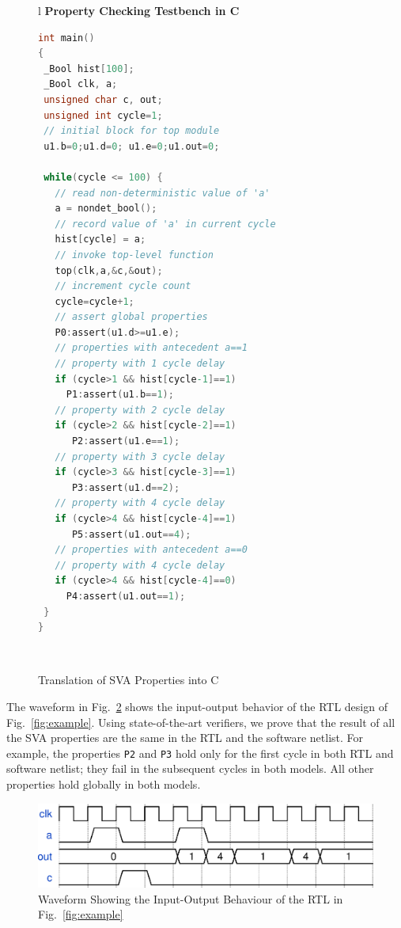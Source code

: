 \begin{figure}[t]
\small
\begin{center}
\begin{tabular}{l}
\hline\noalign{\vskip0.25ex}
\textbf{Property Checking Testbench in C} \\
\hline
\begin{lstlisting}[boxpos=t,mathescape=true,language=C,basicstyle=\scriptsize\ttfamily]
int main() 
{
 _Bool hist[100];
 _Bool clk, a;
 unsigned char c, out;
 unsigned int cycle=1;
 // initial block for top module
 u1.b=0;u1.d=0; u1.e=0;u1.out=0; 
 
 while(cycle <= 100) {
   // read non-deterministic value of 'a'
   a = nondet_bool(); 
   // record value of 'a' in current cycle
   hist[cycle] = a;
   // invoke top-level function
   top(clk,a,&c,&out);
   // increment cycle count
   cycle=cycle+1; 
   // assert global properties 
   P0:assert(u1.d>=u1.e);
   // properties with antecedent a==1 
   // property with 1 cycle delay
   if (cycle>1 && hist[cycle-1]==1) 
     P1:assert(u1.b==1);
   // property with 2 cycle delay
   if (cycle>2 && hist[cycle-2]==1)
      P2:assert(u1.e==1); 
   // property with 3 cycle delay
   if (cycle>3 && hist[cycle-3]==1)
      P3:assert(u1.d==2); 
   // property with 4 cycle delay
   if (cycle>4 && hist[cycle-4]==1)
      P5:assert(u1.out==4); 
   // properties with antecedent a==0
   // property with 4 cycle delay
   if (cycle>4 && hist[cycle-4]==0) 
     P4:assert(u1.out==1);
 }
}
\end{lstlisting}\\
\hline
\end{tabular}
\caption{Translation of SVA Properties into C}
\label{fig:sva}
\end{center}
\end{figure}

The waveform in Fig.\ \ref{intro-waveform} shows the input-output behavior of the RTL design 
of Fig.\ \ref{fig:example}. Using state-of-the-art verifiers, we prove that the result of all the SVA properties 
are the same in the RTL and the software netlist. For example, the properties \texttt{P2} and \texttt{P3} 
hold only for the first cycle in both RTL and software netlist; they fail in the 
subsequent cycles in both models.  All other properties 
hold globally in both models.
%
\begin{figure} 
\begin{center}
  \includegraphics[width=\columnwidth]{figures/example/waveform1.eps}%
	\caption{Waveform Showing the Input-Output Behaviour of the RTL in Fig.~\ref{fig:example}}
\label{intro-waveform}
\end{center}
\end{figure}
%
